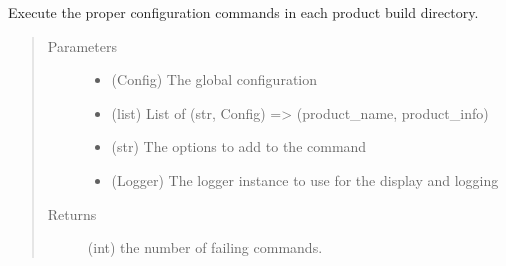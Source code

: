 \documentclass[a4paper,10pt,english]{sphinxmanual}
\begin{document}
\begin{fulllineitems}
\label{\detokenize{apidoc_commands/commands:commands.make.make_all_products}}
Execute the proper configuration commands 
in each product build directory.
\begin{quote}\begin{description}
\item[{Parameters}] \leavevmode\begin{itemize}
\item {} 
 \textendash{} (Config) The global configuration

\item {} 
 \textendash{} (list) 
List of (str, Config) =\textgreater{} (product\_name, product\_info)

\item {} 
 \textendash{} (str) The options to add to the command

\item {} 
 \textendash{} (Logger) 
The logger instance to use for the display and logging

\end{itemize}

\item[{Returns}] \leavevmode
(int) the number of failing commands.

\end{description}\end{quote}

\end{fulllineitems}

\end{document}
